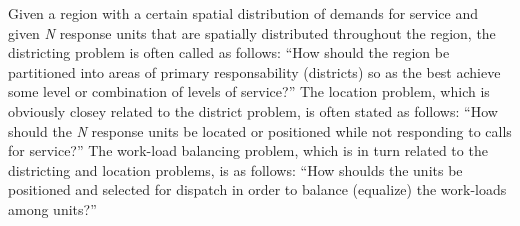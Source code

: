 Given a region
with
a certain spatial distribution of demands for service
and
given \textit{N} response units
that are spatially distributed
throughout the region,
the districting problem
is often called
as follows:
``How should the region
be partitioned into areas
of primary responsability (districts)
so as
the best achieve some level
or combination of levels of service?''
The location problem,
which is obviously closey related
to the district problem,
is often stated as follows:
``How should
the \textit{N} response units
be located or positioned
while not responding to calls for service?''
The work-load balancing problem,
which is in turn
related to the districting and location problems,
is as follows:
``How shoulds the units
be positioned and selected for dispatch
in order to balance (equalize)
the work-loads among units?''
